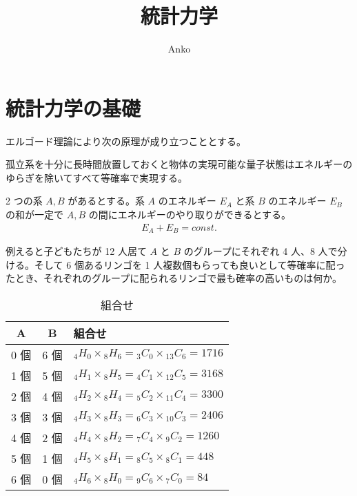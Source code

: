 \documentclass[uplatex,diffipdfmx,a4paper,11pt]{jlreq}
\title{統計力学}
\author{Anko}
\theoremstyle{definition}
\begin{document}
\maketitle
\tableofcontents
\clearpage

\section{統計力学の基礎}
エルゴード理論により次の原理が成り立つこととする。
\begin{axiom}[等確率の原理]
  孤立系を十分に長時間放置しておくと物体の実現可能な量子状態はエネルギーのゆらぎを除いてすべて等確率で実現する。
\end{axiom}

2 つの系 $A, B$ があるとする。系 $A$ のエネルギー $E_A$ と系 $B$ のエネルギー $E_B$ の和が一定で $A, B$ の間にエネルギーのやり取りができるとする。
\begin{align}
  E_A + E_B = const.
\end{align}

例えると子どもたちが 12 人居て $A$ と $B$ のグループにそれぞれ 4 人、8 人で分ける。そして 6 個あるリンゴを 1 人複数個もらっても良いとして等確率に配ったとき、それぞれのグループに配られるリンゴで最も確率の高いものは何か。
\begin{table}[hbtp]
  \label{table:micro}
  \centering
  \begin{tabular}{|c|c|l|}
    \hline
    A   & B   & 組合せ                                                         \\
    \hline
    0 個 & 6 個 & ${}_4H_0\times {}_{8}H_6 = {}_3C_0\times {}_{13}C_6 = 1716$ \\
    1 個 & 5 個 & ${}_4H_1\times {}_{8}H_5 = {}_4C_1\times {}_{12}C_5 = 3168$ \\
    2 個 & 4 個 & ${}_4H_2\times {}_{8}H_4 = {}_5C_2\times {}_{11}C_4 = 3300$ \\
    3 個 & 3 個 & ${}_4H_3\times {}_{8}H_3 = {}_6C_3\times {}_{10}C_3 = 2406$ \\
    4 個 & 2 個 & ${}_4H_4\times {}_{8}H_2 = {}_7C_4\times {}_{9}C_2 = 1260$  \\
    5 個 & 1 個 & ${}_4H_5\times {}_{8}H_1 = {}_8C_5\times {}_{8}C_1 = 448$   \\
    6 個 & 0 個 & ${}_4H_6\times {}_{8}H_0 = {}_9C_6\times {}_{7}C_0 = 84$    \\
    \hline
  \end{tabular}
  \caption{組合せ}
\end{table}
\end{document}
